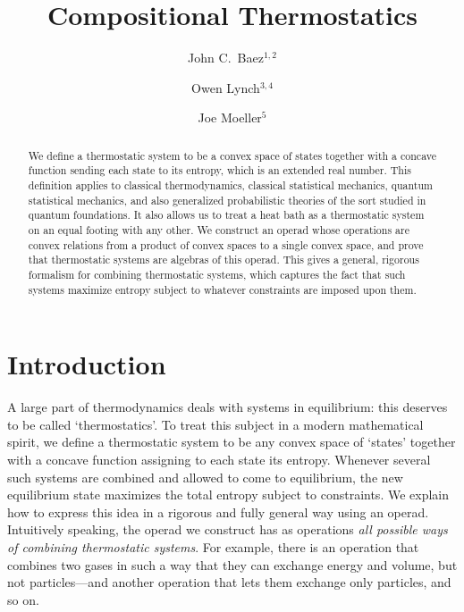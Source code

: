 \documentclass[12pt, reqno]{amsart}
\title{Compositional Thermostatics}
\author[Baez]{John C.\ Baez$^{1,2}$}
\author[Lynch]{Owen Lynch$^{3,4}$}
\author[Moeller]{Joe Moeller$^{5}$}
\begin{document}

\begin{abstract}
We define a thermostatic system to be a convex space of states together with a concave function sending each state to its entropy, which is an extended real number. This definition applies to classical thermodynamics, classical statistical mechanics, quantum statistical mechanics, and also generalized probabilistic theories of the sort studied in quantum foundations. It also allows us to treat a heat bath as a thermostatic system on an equal footing with any other. We construct an operad whose operations are convex relations from a product of convex spaces to a single convex space, and prove that thermostatic systems are algebras of this operad. This gives a general, rigorous formalism for combining thermostatic systems, which captures the fact that such systems maximize entropy subject to whatever constraints are imposed upon them. 
\end{abstract}

\maketitle

\section{Introduction}

A large part of thermodynamics deals with systems in equilibrium: this deserves to be called `thermostatics'. To treat this subject in a modern mathematical spirit, we define a thermostatic system to be any convex space of `states' together with a concave function assigning to each state its entropy. Whenever several such systems are combined and allowed to come to equilibrium, the new equilibrium state maximizes the total entropy subject to constraints. We explain how to express this idea in a rigorous and fully general way using an operad. Intuitively speaking, the operad we construct has as operations \emph{all possible ways of combining thermostatic systems}. For example, there is an operation that combines two gases in such a way that they can exchange energy and volume, but not particles---and another operation that lets them exchange only particles, and so on.
\end{document}
